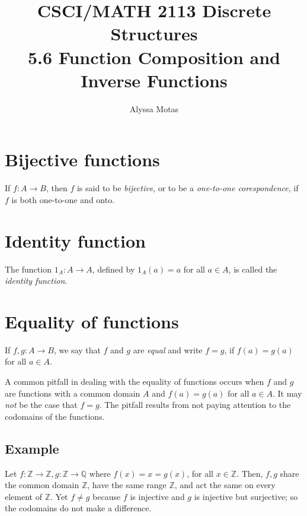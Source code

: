 \documentclass[11pt]{article}
\title{\textbf{CSCI/MATH 2113 Discrete Structures} \\ 5.6 Function Composition and Inverse Functions}
\author{Alyssa Motas}
\begin{document}
    \maketitle

    \pagebreak

    \tableofcontents

    \pagebreak

    \section{Bijective functions}

    If \(f: A \rightarrow B\), then $f$ is said to be \emph{bijective}, or to be a \emph{one-to-one corespondence}, if $f$ is both one-to-one and onto.

    \section{Identity function}

    The function \(1_A : A \rightarrow A\), defined by \(1_A (a) = a\) for all \(a \in A\), is called the \emph{identity function}.

    \section{Equality of functions}

    If \(f,g : A \rightarrow B\), we say that $f$ and $g$ are \emph{equal} and write \(f = g\), if \(f(a) = g(a)\) for all \(a \in A\).

    A common pitfall in dealing with the equality of functions occurs when $f$ and $g$ are functions with a common domain $A$ and \(f(a) = g(a)\) for all \(a \in A\). It may \emph{not} be the case that \(f = g\). The pitfall results from not paying attention to the codomains of the functions.

    \subsection{Example}

    Let \(f: \mathbb{Z} \rightarrow \mathbb{Z}, g: \mathbb{Z} \rightarrow \mathbb{Q}\) where \(f(x) = x = g(x)\), for all \(x \in \mathbb{Z}\). Then, \(f,g \) share the common domain \(\mathbb{Z}\), have the same range \(\mathbb{Z}\), and act the same on every element of \(\mathbb{Z}\). Yet \(f \neq g\) because $f$ is injective and $g$ is injective but surjective; so the codomains do not make a difference.
\end{document}
